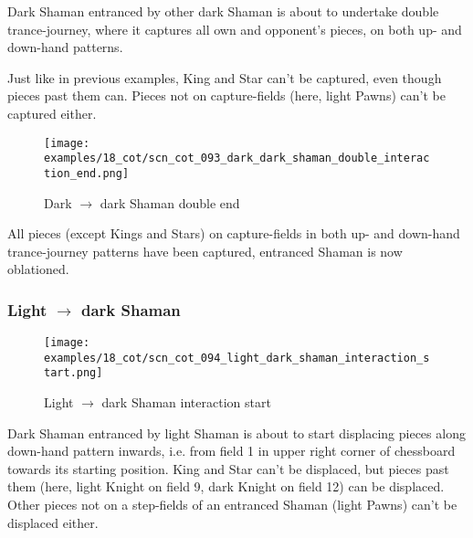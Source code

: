 Dark Shaman entranced by other dark Shaman is about to undertake double
trance-journey, where it captures all own and opponent's pieces, on both
up- and down-hand patterns.

Just like in previous examples, King and Star can't be captured, even though
pieces past them can. Pieces not on capture-fields (here, light Pawns) can't
be captured either.

\clearpage %

\noindent
\begin{figure}[!h]
\texttt{[image: examples/18\_cot/scn\_cot\_093\_dark\_dark\_shaman\_double\_interaction\_end.png]}
\caption{Dark $\rightarrow$ dark Shaman double end}
\label{fig:scn_cot_093_dark_dark_shaman_double_interaction_end}
\end{figure}

All pieces (except Kings and Stars) on capture-fields in both up- and down-hand
trance-journey patterns have been captured, entranced Shaman is now oblationed.

\clearpage %

\subsubsection*{Light $\rightarrow$ dark Shaman}
\label{sec:Conquest of Tlalocan/Trance-journey/Interactions/Light --> dark Shaman}

\vspace*{-1.5\baselineskip}
\noindent
\begin{figure}[!h]
\texttt{[image: examples/18\_cot/scn\_cot\_094\_light\_dark\_shaman\_interaction\_start.png]}
\vspace*{-1.4\baselineskip}
\caption{Light $\rightarrow$ dark Shaman interaction start}
\label{fig:scn_cot_094_light_dark_shaman_interaction_start}
\end{figure}

\vspace*{-0.5\baselineskip}
Dark Shaman entranced by light Shaman is about to start displacing pieces along
down-hand pattern inwards, i.e. from field 1 in upper right corner of chessboard
towards its starting position.\newline
\indent
King and Star can't be displaced, but pieces past them (here, light Knight on field
9, dark Knight on field 12) can be displaced. Other pieces not on a step-fields of
an entranced Shaman (light Pawns) can't be displaced either.

